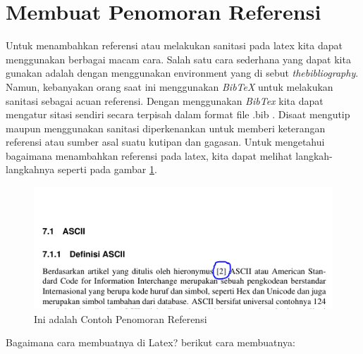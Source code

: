 \section{Membuat Penomoran Referensi}
Untuk menambahkan referensi atau melakukan sanitasi pada latex kita dapat menggunakan berbagai macam cara. Salah satu cara sederhana yang dapat kita gunakan adalah dengan menggunakan environment yang di sebut \textit{thebibliography}. Namun, kebanyakan orang saat ini menggunakan \textit{BibTeX} untuk melakukan sanitasi sebagai acuan referensi. Dengan menggunakan \textit{BibTex} kita dapat mengatur sitasi sendiri secara terpisah dalam format file \*.bib \cite{atmaja2015tutorial}. Disaat mengutip maupun menggunakan sanitasi diperkenankan untuk memberi keterangan referensi atau sumber asal suatu kutipan dan gagasan. Untuk mengetahui bagaimana menambahkan referensi pada latex, kita dapat melihat langkah-langkahnya seperti pada gambar \ref{fig:contohpenomoranref}.
\begin{figure}[!htbp]
  \centering
  \includegraphics[width=.75\textwidth]{figures/contohpenomoranref.png}
  \caption{Ini adalah Contoh Penomoran Referensi}\label{fig:contohpenomoranref}
\end{figure}
\par Bagaimana cara membuatnya di Latex? berikut cara membuatnya:
